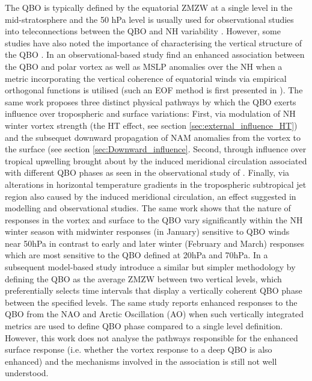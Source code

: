 The QBO is typically defined by the equatorial ZMZW at a single level in the mid-stratosphere and the 50 hPa level is usually used for observational studies into teleconnections between the QBO and NH variability \citep{baldwinQuasiBiennial2001}. However, some studies have also noted the importance of characterising the vertical structure of the QBO \citep{Fraedrih1993, Wallace1993,  Baldwin98,  Dunkerton2017, graySurface2018, andrewsObserved2019}. In an observational-based study \cite{graySurface2018} find an enhanced association between the QBO and polar vortex as well as MSLP anomalies over the NH when a metric incorporating the vertical coherence of equatorial winds via empirical orthogonal functions is utilised (such an EOF method is first presented in \citep{verena2016a}). The same work proposes three distinct physical pathways by which the QBO exerts influence over tropospheric and surface variations: First, via modulation of NH winter vortex strength (the HT effect, see section \ref{sec:external_influence_HT}) and the subsequet downward propagation of NAM anomalies from the vortex to the surface (see section \ref{sec:Downward_influence}. Second, through influence over tropical upwelling brought about by the induced meridional circulation associated with different QBO phases as seen in the observational study of \cite{liessRelationship2012}. Finally, via alterations in horizontal temperature gradients in the tropospheric subtropical jet region also caused by the induced meridional circulation, an effect suggested in modelling \citep{garfinkelInfluence2011} and observational studies. The same work shows that the nature of responses in the vortex and surface to the QBO vary significantly within the NH winter season with midwinter responses (in January) sensitive to QBO winds near 50hPa in contrast to early and later winter (February and March) responses which are most sensitive to the QBO defined at 20hPa and 70hPa. In a subsequent model-based study \cite{andrewsObserved2019d} introduce a similar but simpler methodology by defining the QBO as the average ZMZW between two vertical levels, which preferentially selects time intervals that display a vertically coherent QBO phase between the specified levels. The same study reports enhanced responses to the QBO from the NAO and Arctic Oscillation (AO) when such vertically integrated metrics are used to define QBO phase compared to a single level definition. However, this work does not analyse the pathways responsible for the enhanced surface response (i.e. whether the vortex response to a deep QBO is also enhanced) and the mechanisms involved in the association is still not well understood. 

